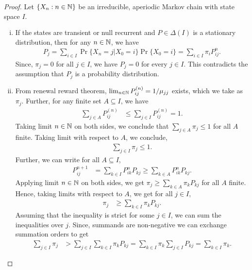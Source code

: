 \documentclass[a4paper,10pt,english]{article}
\begin{document}
\begin{proof} Let $\{X_n: n \in \mathbb{N}\}$ be an irreducible, aperiodic Markov chain with state space $I$. 
\begin{enumerate}[i)]
\item 
If the states are transient or null recurrent and $P \in \Delta(I)$ is a stationary distribution, 
then for any $n \in \mathbb{N}$, we have
\begin{align*}
P_j = \sum_{i \in I} \Pr\{X_n = j|X_0 = i\} \Pr\{X_0 = i\} = \sum_{i \in I} \pi_i P_{ij}^n.
\end{align*} 
Since, $\pi_j = 0$ for all $j \in I$, we have $P_j=0$ for every $j \in I$. 
This contradicts the assumption that $P_j$ is a probability distribution. 
\item 
From renewal reward theorem, $\lim_{n \in \mathbb{N}}P_{ij}^{(n)} = 1/\mu_{jj}$ exists, which we take as $\pi_j$. Further, for any finite set $A \subseteq I$, we have
\begin{align*}
\sum_{j \in A} P_{ij}^{(n)}&\leq \sum_{j \in I} P_{ij}^{(n)} = 1.
\end{align*}
Taking limit $n \in \mathbb{N}$ on both sides, we conclude that $\sum_{j \in A}\pi_j  \leq 1$ for all $A$ finite. Taking limit with respect to $A$, we conclude,  
\begin{align*}
\sum_{j \in I} \pi_j \leq 1.
\end{align*}
Further, we can write for all $A \subseteq I$,
\begin{align*}
P_{ij}^{n+1} &= \sum_{k \in I}P_{ik}^nP_{kj} \geq \sum_{k \in A}P_{ik}^nP_{kj}.
\end{align*}
Applying limit $n \in \mathbb{N}$ on both sides, %
we get $\pi_j \geq \sum_{k \in A} \pi_kP_{kj}$ for all $A$ finite. 
Hence, taking limits with respect to $A$, we get for all $j \in I$,
\begin{align*}
\pi_j &\geq \sum_{k\in I} \pi_kP_{kj}.
\end{align*}	
Assuming that the inequality is strict for some $j \in I$, we can sum the inequalities over $j$. 
Since, summands are non-negative we can exchange summation orders to get
\begin{align*}
\sum_{j \in I} \pi_j &> \sum_{j \in I} \sum_{k \in I}\pi_kP_{kj} = \sum_{k \in I} \pi_k \sum_{j \in I} P_{kj} = \sum_{k \in I} \pi_k.
\end{align*}	

\end{enumerate}
\end{proof}
\end{document}
